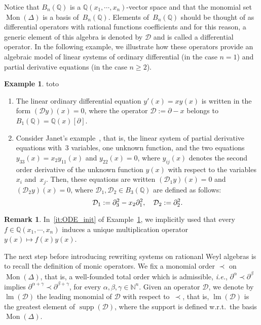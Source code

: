 \documentclass[10pt]{easychair}
\theoremstyle{definition}
\newtheorem{remark}[theorem]{Remark}
\newtheorem{example}[theorem]{Example}
\newcommand\ie{\emph{i.e.}}
\DeclareMathOperator{\supp}{supp}
\newcommand\D{\mathcal{D}}
\DeclareMathOperator{\lm}{lm}
\newcommand\Q{\mathbb{Q}}
\newcommand\N{\mathbb{N}}
\newcommand\QXX{\mathbb{Q}(x_1,\cdots,x_n)}
\newcommand\Weyl[1]{B_{#1}(\Q)}
\newcommand\monBasis{\Mon(\Delta)}
\DeclareMathOperator{\Mon}{Mon}
\begin{document}
Notice that $\Weyl{n}$ is a $\QXX$-vector space and that the monomial set
$\monBasis$ is a basis of~$\Weyl{n}$. Elements of~$\Weyl{n}$ should be
thought of as differential operators with rational functions coefficients
and for this reason, a generic element of this algebra is denoted by $\D$
and is called a differential operator. In the following example, we
illustrate how these operators provide an algebraic model of linear
systems of ordinary differential (in the case $n=1$) and partial
derivative equations (in the case $n\geq 2$). 
\smallskip

\begin{example}\label{ex:diff_operators_init}
  {\color{white}toto}
  \begin{enumerate}
  \item\label{it:ODE_init} The linear ordinary differential equation
    $y'(x)=xy(x)$ is written in the form $(\D y)(x)=0$, where the operator
    $\D:=\partial-x$ belongs to $\Weyl{1}=\Q(x)[\partial]$. 
  \item\label{it:Janet_example_init} Consider Janet's
    example~\cite{MR1308976}, that is, the linear system of partial
    derivative equations with~$3$ variables, one unknown function, and
    the two equations $y_{33}(x)=x_2y_{11}(x)$ and $y_{22}(x)=0$, where
    $y_{ij}(x)$ denotes the second order derivative of the unknown
    function $y(x)$ with respect to the variables $x_i$ and~$x_j$. Then,
    these equations are written $(\D_1y)(x)=0$ and $(\D_2y)(x)=0$, where
    $\D_1,\D_2\in\Weyl{3}$ are defined as follows:
    \[\D_1:=\partial_3^2-x_2\partial_1^2,\quad \D_2:=\partial_2^2.
    \smallskip\]
  \end{enumerate}
\end{example}

\begin{remark}
  In~\ref{it:ODE_init} of Example~\ref{ex:diff_operators_init}, we
  implicitly used that every $f\in\QXX$ induces a unique multiplication
  operator $y(x)\mapsto f(x)y(x)$.
\end{remark}
\smallskip

The next step before introducing rewriting systems on rationanl Weyl
algebras is to recall the definition of monic operators. We fix a
monomial order $\prec$ on $\monBasis$, that is, a well-founded total 
order which is admissible, \ie, $\partial^{\alpha}\prec\partial^{\beta}$
implies $\partial^{\alpha+\gamma}\prec\partial^{\beta+\gamma}$, for every
$\alpha,\beta,\gamma\in\N^n$. Given an operator $\D$, we denote by
$\lm(\D)$ the leading monomial of $\D$ with respect to~$\prec$, that 
is, $\lm(\D)$ is the greatest element of $\supp(\D)$, where the support 
is defined w.r.t.\ the basis $\monBasis$. 
\smallskip
\end{document}

